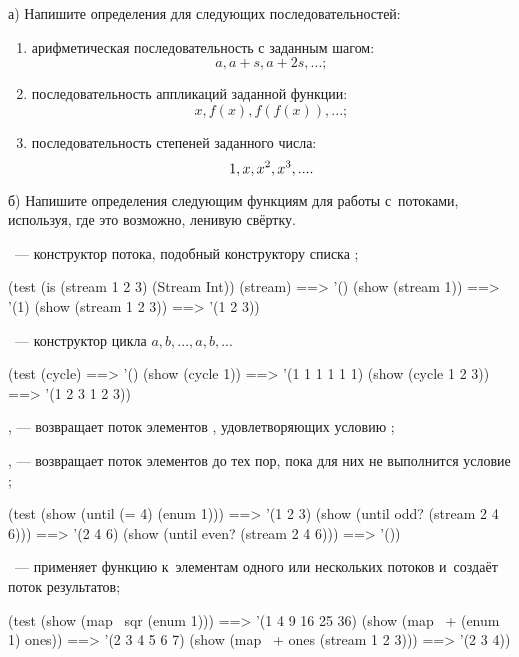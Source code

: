 \begin{Assignment}
а) Напишите определения для следующих последовательностей:
\begin{enumerate}
\item арифметическая последовательность с заданным шагом: $$a, a+s, a+2s, ...;$$
\item последовательность аппликаций заданной функции: $$x, f(x), f(f(x)), ...;$$
\item последовательность степеней заданного числа: $$1, x, x^2 , x^3, ... .$$
\end{enumerate}


б) Напишите определения следующим функциям для работы с~потоками, используя, где это возможно, ленивую свёртку.

~--- конструктор потока, подобный конструктору списка ;
\begin{Specification}
(test 
  (is (stream 1 2 3) (Stream Int))
  (stream)              ==> '()
  (show (stream 1))     ==> '(1)
  (show (stream 1 2 3)) ==> '(1 2 3))
\end{Specification}

~--- конструктор цикла $a,b,...,a, b,...$
\begin{Specification}
(test 
  (cycle)              ==> '()
  (show (cycle 1))     ==> '(1 1 1 1 1 1)
  (show (cycle 1 2 3)) ==> '(1 2 3 1 2 3))
\end{Specification}


\label{lazy-filter}, --- возвращает поток элементов , удовлетворяющих условию ;

\label{until}, --- возвращает поток элементов  до тех пор, пока для них не выполнится условие ;

\begin{Specification}
(test
  (show (until (= 4) (enum 1)))       ==> '(1 2 3)
  (show (until odd? (stream 2 4 6)))  ==> '(2 4 6)
  (show (until even? (stream 2 4 6))) ==> '())
\end{Specification}

~--- применяет функцию  к~элементам одного или нескольких потоков и~создаёт поток результатов;

\begin{Specification}
(test
  (show (map~ sqr (enum 1)))          ==> '(1 4 9 16 25 36)
  (show (map~ + (enum 1) ones))       ==> '(2 3 4 5 6 7)
  (show (map~ + ones (stream 1 2 3))) ==> '(2 3 4))
\end{Specification}
\end{Assignment}


